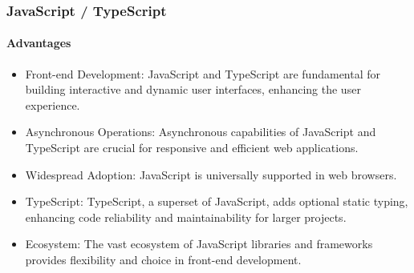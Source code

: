     \subsubsection{JavaScript / TypeScript}
        \paragraph{Advantages}
        \begin{itemize}
            \item Front-end Development: JavaScript and TypeScript are fundamental for building interactive and dynamic user interfaces, enhancing the user experience.
            \item Asynchronous Operations: Asynchronous capabilities of JavaScript and TypeScript are crucial for responsive and efficient web applications.
            \item Widespread Adoption: JavaScript is universally supported in web browsers.
            \item TypeScript: TypeScript, a superset of JavaScript, adds optional static typing, enhancing code reliability and maintainability for larger projects.
            \item Ecosystem: The vast ecosystem of JavaScript libraries and frameworks provides flexibility and choice in front-end development.
        \end{itemize}
        
